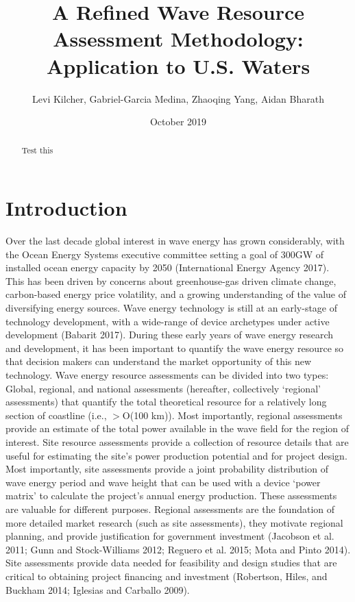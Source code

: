 \documentclass{elsarticle}
\title{A Refined Wave Resource Assessment Methodology: Application to U.S. Waters}
\author{Levi Kilcher, Gabriel-Garcia Medina, Zhaoqing Yang, Aidan Bharath}
\date{October 2019}
\begin{document}
\maketitle


\begin{abstract}
Test this
\end{abstract}

\section{Introduction}

Over the last decade global interest in wave energy has grown considerably, with the Ocean Energy Systems executive committee setting a goal of 300GW of installed ocean energy capacity by 2050 (International Energy Agency 2017). This has been driven by concerns about greenhouse-gas driven climate change, carbon-based energy price volatility, and a growing understanding of the value of diversifying energy sources. Wave energy technology is still at an early-stage of technology development, with a wide-range of device archetypes under active development (Babarit 2017).
During these early years of wave energy research and development, it has been important to quantify the wave energy resource so that decision makers can understand the market opportunity of this new technology. Wave energy resource assessments can be divided into two types:
Global, regional, and national assessments (hereafter, collectively ‘regional’ assessments) that quantify the total theoretical resource for a relatively long section of coastline (i.e., $>$O(100 km)). Most importantly, regional assessments provide an estimate of the total power available in the wave field for the region of interest.
Site resource assessments provide a collection of resource details that are useful for estimating the site’s power production potential and for project design. Most importantly, site assessments provide a joint probability distribution of wave energy period and wave height that can be used with a device ‘power matrix’ to calculate the project’s annual energy production.
These assessments are valuable for different purposes. Regional assessments are the foundation of more detailed market research (such as site assessments), they motivate regional planning, and provide justification for government investment \citep[e.g., ][]{EPRIwaveresource2011,gunnQuantifyingGlobalWave2012}
(Jacobson et al. 2011; Gunn and Stock-Williams 2012; Reguero et al. 2015; Mota and Pinto 2014). Site assessments provide data needed for feasibility and design studies that are critical to obtaining project financing and investment (Robertson, Hiles, and Buckham 2014; Iglesias and Carballo 2009). 
\end{document}

